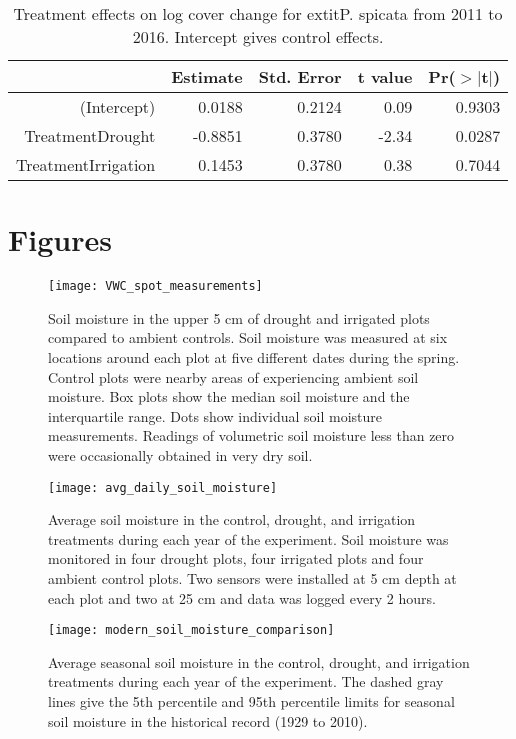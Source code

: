 \documentclass[11pt]{article}
\begin{document}
\begin{table}[ht]
	\centering
	\begin{tabular}{rrrrr}
		\hline
		& Estimate & Std. Error & t value & Pr($>$$|$t$|$) \\ 
		\hline
		(Intercept) & 0.0188 & 0.2124 & 0.09 & 0.9303 \\ 
		TreatmentDrought & -0.8851 & 0.3780 & -2.34 & 0.0287 \\ 
		TreatmentIrrigation & 0.1453 & 0.3780 & 0.38 & 0.7044 \\ 
		\hline
	\end{tabular}
	\caption{Treatment effects on log cover change for 	extit{P. spicata} from 2011 to 2016. Intercept gives control effects.} 
	\label{table:changePSSP}
\end{table}





\section{Figures}

\begin{figure}[tbp]
	\centering
	\texttt{[image: VWC\_spot\_measurements]}
	\caption{Soil moisture in the upper 5 cm of drought and irrigated plots compared to ambient controls. Soil moisture was measured at six locations around each plot at five different dates during the spring. Control plots were nearby areas of experiencing ambient soil moisture. Box plots show the median soil moisture and the interquartile range.  Dots show individual soil moisture measurements. Readings of volumetric soil moisture less than zero were occasionally obtained in very dry soil.}
	\label{fig:spotVWC}
\end{figure}


\begin{figure}[tbp]
	\centering
	\texttt{[image: avg\_daily\_soil\_moisture]}
	\caption{Average soil moisture in the control, drought, and irrigation treatments during each year of the experiment.  Soil moisture was monitored in four drought plots, four irrigated plots and four ambient control plots. Two sensors were installed at 5 cm depth at each plot and two at 25 cm and data was logged every 2 hours.}
	\label{fig:dailyVWC}
\end{figure}


\begin{figure}[tbp]
	\centering
	\texttt{[image: modern\_soil\_moisture\_comparison]}
	\caption{Average seasonal soil moisture in the control, drought, and irrigation treatments during each year of the experiment. The dashed gray lines give the 5th percentile and 95th percentile limits for seasonal soil moisture in the historical record (1929 to 2010). }
	\label{fig:seasonalVWC}
\end{figure}
\end{document}

